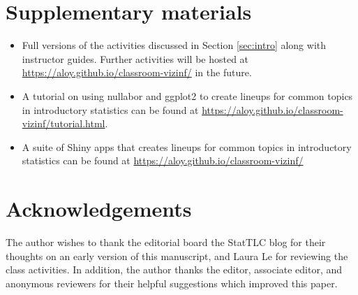 \documentclass[12pt]{article}
\begin{document}
\section*{Supplementary materials}

\begin{itemize}
\item
  Full versions of the activities discussed in Section \ref{sec:intro}
  along with instructor guides. Further activities will be hosted at
  \url{https://aloy.github.io/classroom-vizinf/} in the future.
\item
  A tutorial on using nullabor and ggplot2 to create lineups for common
  topics in introductory statistics can be found at
  \url{https://aloy.github.io/classroom-vizinf/tutorial.html}.
\item
  A suite of Shiny apps that creates lineups for common topics in
  introductory statistics can be found at
  \url{https://aloy.github.io/classroom-vizinf/}
\end{itemize}

\section*{Acknowledgements}

The author wishes to thank the editorial board the StatTLC blog for
their thoughts on an early version of this manuscript, and Laura Le for
reviewing the class activities. In addition, the author thanks the
editor, associate editor, and anonymous reviewers for their helpful
suggestions which improved this paper.



\end{document}
